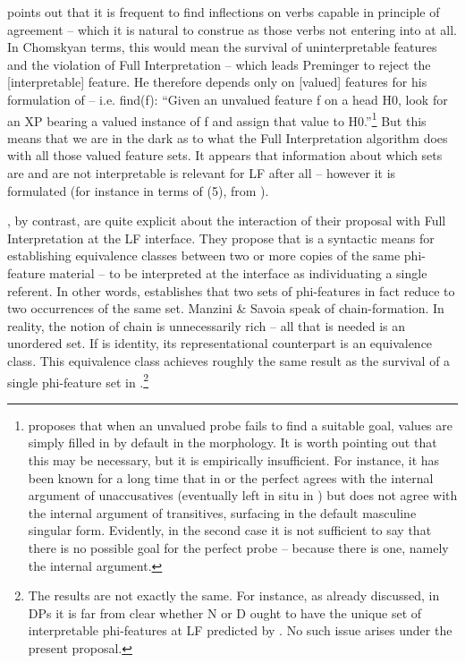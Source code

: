 \documentclass[output=paper]{langsci/langscibook}
\begin{document}
\citet{Preminger2014}{} points out that it is frequent to find  inflections on verbs capable in principle of agreement – which it is natural to construe as those verbs not entering into  at all.{} In Chomskyan terms, this would mean the survival of uninterpretable features and the violation of Full Interpretation – which leads Preminger to reject the [interpretable] feature. He therefore {depends only on [valued] features for his formulation of  – i.e.} {fi}{nd(f): “Given an unvalued feature f on a head H0, look for an XP bearing a valued instance of f and assign that value to H0.”}\footnote{\citet{Preminger2014} proposes that when an unvalued probe fails to find a suitable goal, values are simply filled in by default in the morphology. It is worth pointing out that this may be necessary, but it is empirically insufficient. For instance, it has been known for a long time \citep{Kayne1989} that in  or  the perfect  agrees with the internal argument of unaccusatives (eventually left in situ in ) but does not agree with the internal argument of transitives, surfacing in the default masculine singular form. Evidently, in the second case it is not sufficient to say that there is no possible goal for the perfect  probe – because there is one, namely the internal argument.} { But this means that we are in the dark as to what the Full Interpretation algorithm does with all those valued feature sets. It appears that information about which sets are and are not interpretable is relevant for LF after all – however it is formulated (for instance in terms of (5), from \citealt{Baker2008}).}

   \citet{Manzini2007}, by contrast, are quite explicit about the interaction of their proposal with Full Interpretation at the LF interface. They propose that  is a syntactic means for establishing equivalence classes between two or more copies of the same phi-feature material – to be interpreted at the interface as individuating a single referent. In other words,  establishes that two sets of phi-features in fact reduce to two occurrences of the same set. Manzini \& Savoia speak of chain-formation. In reality, the notion of chain is unnecessarily rich – all that is needed is an unordered set. If  is identity, its representational counterpart is an equivalence class. This equivalence class achieves roughly the same result as the survival of a single phi-feature set in \citet{Chomsky2000,Chomsky2001Derivation}.\footnote{The results are not exactly the same. For instance, {as already discussed, in DPs it is far from clear whether N or D ought to have the unique set of interpretable phi-featu}{r}{es at LF}{ predicted by \citet{Chomsky2001Derivation}. No such issue arises under the present proposal.}}
\end{document}
